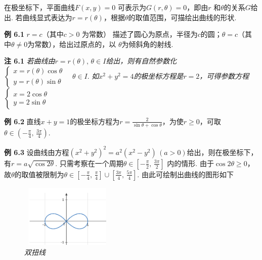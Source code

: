 \documentclass{article}
\begin{document}
在极坐标下，平面曲线$F(x,y)=0$ 可表示为$G(r,\theta)=0$，即由$r$ 和$\theta$的关系$G$给出. 若曲线显式表达为$r=r(\theta)$，根据$\theta$的取值范围，可描绘出曲线的形状. 

\vspace{3pt}


\textbf{例 6.1} $r=c$（其中$c>0$ 为常数） 描述了圆心为原点，半径为$c$的圆；$\theta=c$（其中$\theta\neq 0$为常数），给出过原点的，以 $\theta$为倾斜角的射线. 

\vspace{3pt}

\textbf{注 6.1} \textit{若曲线由$r=r(\theta),\,\theta\in I$给出，则有自然参数化}$\left\{\begin{array}{c}
     x=r(\theta)\cos\theta  \\
     y=r(\theta)\sin\theta
\end{array}\right.\quad\theta\in I$. \textit{如$x^{2}+y^{2}=4$的极坐标方程是$r=2$，可得参数方程$\left\{\begin{array}{c}
     x=2\cos{\theta}  \\
     y=2\sin{\theta}
\end{array}\right.$}

\vspace{6pt}

\textbf{例 6.2} 直线$x+y=1$的极坐标方程为$r=\frac{2}{\sin{\theta}+\cos{\theta}}$，为使$r\geq 0$，可取$\theta\in\left(-\frac{\pi}{4},\,\frac{3\pi}{4}\right) $.

\vspace{3pt}

\textbf{例 6.3} 设曲线由方程$(x^{2}+y^{2})^{2}=a^{2}(x^{2}-y^{2})\,(a>0)$给出，则在极坐标下，有$r=a\sqrt{\cos{2\theta}}$. 只需考察在一个周期$\theta\in \left[-\frac{\pi}{2},\,\frac{3\pi}{2}\right]$ 内的情形. 由于$\cos{2\theta}\geq 0$，故$\theta$的取值被限制为$\theta\in \left[-\frac{\pi}{4},\,\frac{\pi}{4}\right]\cup \left[\frac{3\pi}{4},\,\frac{5\pi}{4}\right]$. 由此可绘制出曲线的图形如下
\begin{center}
    

\begin{figure}[h]
\includegraphics[height=3cm,width=4.5cm]{8.PNG}
\centering
\caption{\textit{双扭线}}
\end{figure}
\end{center}
\end{document}

